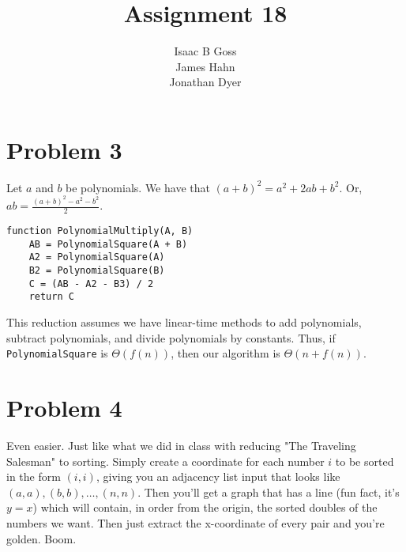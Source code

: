 \documentclass{article}
\author{Isaac B Goss\\ James Hahn\\ Jonathan Dyer}
\title{Assignment 18}
\providecommand{\prob}[1]{\section*{Problem #1}}
\begin{document}
\maketitle
\prob{3}
Let $a$ and $b$ be polynomials.
We have that $(a+b)^2 = a^2 + 2ab + b^2$.
Or, $\displaystyle ab = \frac{(a+b)^2 - a^2 - b^2}{2}$.\\
\begin{lstlisting}
function PolynomialMultiply(A, B)
    AB = PolynomialSquare(A + B)
    A2 = PolynomialSquare(A)
    B2 = PolynomialSquare(B)
    C = (AB - A2 - B3) / 2
    return C
\end{lstlisting}

This reduction assumes we have linear-time methods to add polynomials, subtract polynomials, and divide polynomials by constants.
Thus, if \texttt{PolynomialSquare} is $\Theta(f(n))$, then our algorithm is $\Theta(n + f(n))$.


\prob{4}
Even easier. Just like what we did in class with reducing "The Traveling Salesman" to sorting. Simply create a coordinate for each number $i$ to be sorted in the form $\left(i,i\right)$, giving you an adjacency list input that looks like $\left(a,a\right),\left(b,b\right), \dots, \left(n,n\right)$. Then you'll get a graph that has a line (fun fact, it's $y=x$) which will contain, in order from the origin, the sorted doubles of the numbers we want. Then just extract the x-coordinate of every pair and you're golden. Boom.
\end{document}
